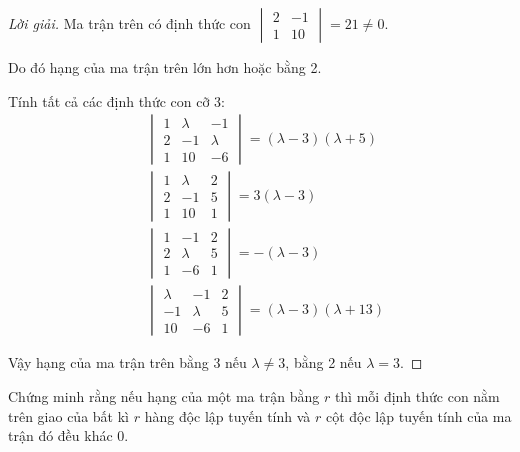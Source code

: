 \documentclass[class=nhvh-linear-algebra,crop=false]{standalone}
\begin{document}
\begin{proof}[Lời giải]
	\par Ma trận trên có định thức con $\begin{vmatrix}2 & -1 \\ 1 & 10\end{vmatrix} = 21 \ne 0$.
	\par Do đó hạng của ma trận trên lớn hơn hoặc bằng 2.
	\par Tính tất cả các định thức con cỡ 3:
	\begin{align*}
		 & \begin{vmatrix}
			   1 & \lambda & -1      \\
			   2 & -1      & \lambda \\
			   1 & 10      & -6
		   \end{vmatrix} = (\lambda - 3)(\lambda + 5)  \\
		 & \begin{vmatrix}
			   1 & \lambda & 2 \\
			   2 & -1      & 5 \\
			   1 & 10      & 1
		   \end{vmatrix} = 3(\lambda - 3)              \\
		 & \begin{vmatrix}
			   1 & -1      & 2 \\
			   2 & \lambda & 5 \\
			   1 & -6      & 1
		   \end{vmatrix} = -(\lambda - 3)              \\
		 & \begin{vmatrix}
			   \lambda & -1      & 2 \\
			   -1      & \lambda & 5 \\
			   10      & -6      & 1
		   \end{vmatrix} = (\lambda - 3)(\lambda + 13)
	\end{align*}
	\par Vậy hạng của ma trận trên bằng 3 nếu $\lambda \ne 3$, bằng 2 nếu $\lambda = 3$.
\end{proof}

\begin{exercise}
	\par Chứng minh rằng nếu hạng của một ma trận bằng $r$ thì mỗi định thức con nằm trên giao của bất kì $r$ hàng độc lập tuyến tính và $r$ cột độc lập tuyến tính của ma trận đó đều khác 0.
\end{exercise}
\end{document}

